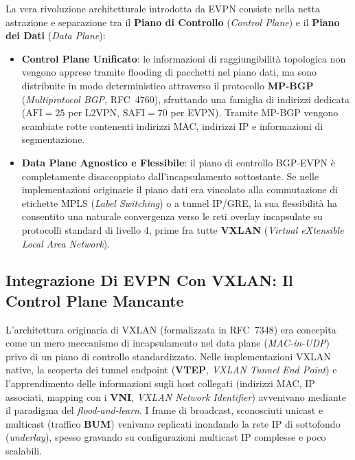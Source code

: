 \documentclass[11pt, a4paper]{article}
\begin{document}
La vera rivoluzione architetturale introdotta da EVPN consiste nella netta astrazione e separazione tra il \textbf{Piano di Controllo} (\emph{Control Plane}) e il \textbf{Piano dei Dati} (\emph{Data Plane}):
\begin{itemize}[noitemsep]
    \item \textbf{Control Plane Unificato}: le informazioni di raggiungibilità topologica non vengono apprese tramite flooding di pacchetti nel piano dati, ma sono distribuite in modo deterministico attraverso il protocollo \textbf{MP-BGP} (\emph{Multiprotocol BGP}, RFC~4760), sfruttando una famiglia di indirizzi dedicata ($\text{AFI} = 25$ per L2VPN, $\text{SAFI} = 70$ per EVPN). Tramite MP-BGP vengono scambiate rotte contenenti indirizzi MAC, indirizzi IP e informazioni di segmentazione.
    \item \textbf{Data Plane Agnostico e Flessibile}: il piano di controllo BGP-EVPN è completamente disaccoppiato dall'incapsulamento sottostante. Se nelle implementazioni originarie il piano dati era vincolato alla commutazione di etichette MPLS (\emph{Label Switching}) o a tunnel IP/GRE, la sua flessibilità ha consentito una naturale convergenza verso le reti overlay incapsulate su protocolli standard di livello 4, prime fra tutte \textbf{VXLAN} (\emph{Virtual eXtensible Local Area Network}).
\end{itemize}


\subsection{Integrazione Di EVPN Con VXLAN: Il Control Plane Mancante}

L'architettura originaria di VXLAN (formalizzata in RFC~7348) era concepita come un mero meccanismo di incapsulamento nel data plane (\emph{MAC-in-UDP}) privo di un piano di controllo standardizzato. Nelle implementazioni VXLAN native, la scoperta dei tunnel endpoint (\textbf{VTEP}, \emph{VXLAN Tunnel End Point}) e l'apprendimento delle informazioni sugli host collegati (indirizzi MAC, IP associati, mapping con i \textbf{VNI}, \emph{VXLAN Network Identifier}) avvenivano mediante il paradigma del \emph{flood-and-learn}. I frame di broadcast, sconosciuti unicast e multicast (traffico \textbf{BUM}) venivano replicati inondando la rete IP di sottofondo (\emph{underlay}), spesso gravando su configurazioni multicast IP complesse e poco scalabili.
\end{document}
